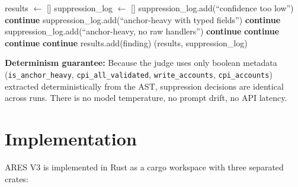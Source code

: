 \documentclass{article}
\begin{document}
\begin{algorithm}[H]
\caption{Apply Local Judge}\label{alg:judge}
\begin{algorithmic}[1]
  \State results $\gets$ []
  \State suppression\_log $\gets$ []
      \State suppression\_log.add(``confidence too low'')
      \State \textbf{continue}
    \EndIf
        \State suppression\_log.add(``anchor-heavy with typed fields'')
        \State \textbf{continue}
      \EndIf
    \EndIf
        \State suppression\_log.add(``anchor-heavy, no raw handlers'')
        \State \textbf{continue}
      \EndIf
    \EndIf
        \State \textbf{continue}
      \EndIf
        \State \textbf{continue}
      \EndIf
    \EndIf
        \State \textbf{continue}
      \EndIf
    \EndIf
    \State results.add(finding)
  \EndFor
  \State \Return (results, suppression\_log)
\EndFunction
\end{algorithmic}
\end{algorithm}
\vspace{-2pt}
\textbf{Determinism guarantee:} Because the judge uses only boolean metadata (\texttt{is\_anchor\_heavy}, \texttt{cpi\_all\_validated}, \texttt{write\_accounts}, \texttt{cpi\_accounts}) extracted deterministically from the AST, suppression decisions are identical across runs. There is no model temperature, no prompt drift, no API latency.

\section{Implementation}
\label{sec:impl}

ARES V3 is implemented in Rust as a cargo workspace with three separated crates:
\end{document}
